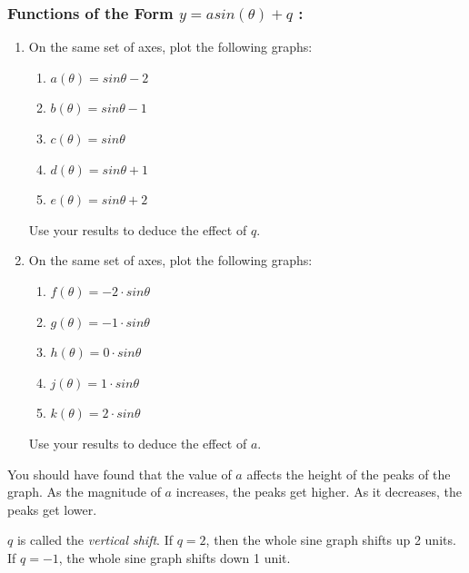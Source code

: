             \subsubsection{  Functions of the Form $y=asin\left(\theta \right)+q$ :}
            \nopagebreak
        \label{m39414*id84695}\begin{enumerate}[noitemsep, label=\textbf{\arabic*}. ] 
            \label{m39414*uid34}\item On the same set of axes, plot the following graphs:
\label{m39414*id84710}\begin{enumerate}[noitemsep, label=\textbf{\alph*}. ] 
            \label{m39414*uid35}\item $a\left(\theta \right)=sin\theta -2$\label{m39414*uid36}\item $b\left(\theta \right)=sin\theta -1$\label{m39414*uid37}\item $c\left(\theta \right)=sin\theta $\label{m39414*uid38}\item $d\left(\theta \right)=sin\theta +1$\label{m39414*uid39}\item $e\left(\theta \right)=sin\theta +2$\end{enumerate}
Use your results to deduce the effect of $q$.
\label{m39414*uid40}\item On the same set of axes, plot the following graphs:
\label{m39414*id84931}\begin{enumerate}[noitemsep, label=\textbf{\alph*}. ] 
            \label{m39414*uid41}\item $f\left(\theta \right)=-2\ensuremath{\cdot}sin\theta $\label{m39414*uid42}\item $g\left(\theta \right)=-1\ensuremath{\cdot}sin\theta $\label{m39414*uid43}\item $h\left(\theta \right)=0\ensuremath{\cdot}sin\theta $\label{m39414*uid44}\item $j\left(\theta \right)=1\ensuremath{\cdot}sin\theta $\label{m39414*uid45}\item $k\left(\theta \right)=2\ensuremath{\cdot}sin\theta $\end{enumerate}
Use your results to deduce the effect of $a$.
\end{enumerate}
        \label{m39414*id85165}You should have found that the value of $a$ affects the height of the peaks of the graph. As the magnitude of $a$ increases, the peaks get higher. As it decreases, the peaks get lower.\par 
        \label{m39414*id85188}$q$ is called the \textsl{vertical shift}. If $q=2$, then the whole sine graph shifts up 2 units. If $q=-1$, the whole sine graph shifts down 1 unit.\par 
